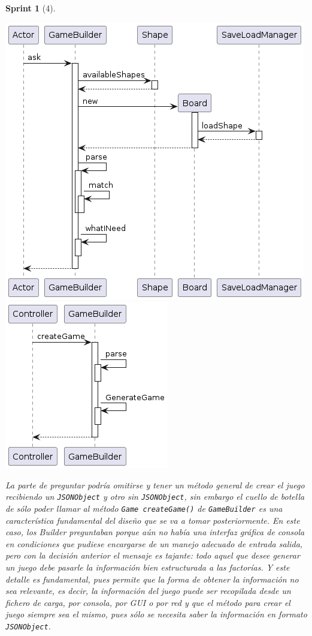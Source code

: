 \documentclass[12pt,a4paper,openright]{book}
\theoremstyle{break}
\newtheorem*{sprint}{Sprint}
\begin{document}
\begin{sprint}[4]
\begin{center}
\includegraphics[scale=0.5]{Builders_sprint4_seq}
\includegraphics[scale=0.5]{Builders2_sprint4_seq}
\end{center}

La parte de preguntar podría omitirse y tener un método general de crear el juego recibiendo un \texttt{JSONObject} y otro sin \texttt{JSONObject}, sin embargo el cuello de botella de sólo poder llamar al método \texttt{Game createGame()} de \texttt{GameBuilder} es una característica fundamental del diseño que se va a tomar posteriormente. En este caso, los Builder preguntaban porque aún no había una interfaz gráfica de consola en condiciones que pudiese encargarse de un manejo adecuado de entrada salida, pero con la decisión anterior el mensaje es tajante: todo aquel que desee generar un juego debe pasarle la información bien estructurada a las factorías. Y este detalle es fundamental, pues permite que la forma de obtener la información no sea relevante, es decir, la información del juego puede ser recopilada desde un fichero de carga, por consola, por GUI o por red y que el método para crear el juego siempre sea el mismo, pues sólo se necesita saber la información en formato \texttt{JSONObject}.
\end{sprint}
\end{document}
